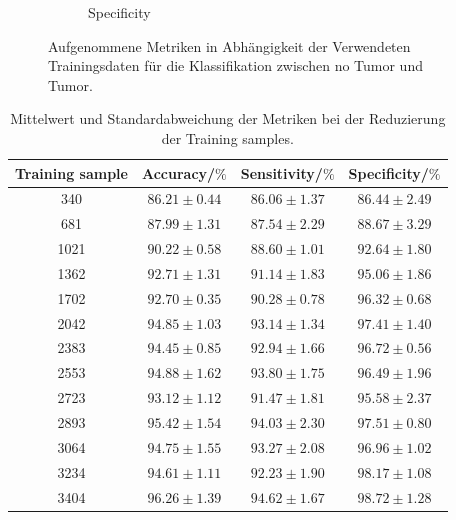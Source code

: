 \begin{figure}[H]
\begin{subfigure}[b]{0.48\textwidth}
    \caption{Specificity}
    \label{fig:reduzierung_specificity}
  \end{subfigure}
  \caption{Aufgenommene Metriken in Abhängigkeit der Verwendeten Trainingsdaten für die Klassifikation zwischen no Tumor und Tumor.}
  \label{fig:reduzierung_trainingsdaten}
\end{figure}
\begin{table}[H]
    \centering
    {\small
        \begin{tabular}{cccc}
            \toprule
            Training sample & Accuracy/$\%$ & Sensitivity/$\%$ & Specificity/$\%$\\
            \midrule
            340  & $86.21 \pm 0.44$ & $86.06 \pm 1.37 $ & $86.44 \pm 2.49$\\
            681  & $87.99 \pm 1.31$ & $87.54 \pm 2.29 $ & $88.67 \pm 3.29$\\
            1021 & $90.22 \pm 0.58$ & $88.60 \pm 1.01 $ & $92.64 \pm 1.80$\\
            1362 & $92.71 \pm 1.31$ & $91.14 \pm 1.83 $ & $95.06 \pm 1.86$\\
            1702 & $92.70 \pm 0.35$ & $90.28 \pm 0.78 $ & $96.32 \pm 0.68$\\
            2042 & $94.85 \pm 1.03$ & $93.14 \pm 1.34 $ & $97.41 \pm 1.40$\\
            2383 & $94.45 \pm 0.85$ & $92.94 \pm 1.66 $ & $96.72 \pm 0.56$\\
            2553 & $94.88 \pm 1.62$ & $93.80 \pm 1.75 $ & $96.49 \pm 1.96$\\
            2723 & $93.12 \pm 1.12$ & $91.47 \pm 1.81 $ & $95.58 \pm 2.37$\\
            2893 & $95.42 \pm 1.54$ & $94.03 \pm 2.30 $ & $97.51 \pm 0.80$\\
            3064 & $94.75 \pm 1.55$ & $93.27 \pm 2.08 $ & $96.96 \pm 1.02$\\
            3234 & $94.61 \pm 1.11$ & $92.23 \pm 1.90 $ & $98.17 \pm 1.08$\\
            3404 & $96.26 \pm 1.39$ & $94.62 \pm 1.67 $ & $98.72 \pm 1.28$\\ 
            \bottomrule
        \end{tabular}
    }
  \caption{Mittelwert und Standardabweichung der Metriken bei der Reduzierung der Training samples.}
  \label{tab:reduzierung_trainingsdaten}
\end{table}

